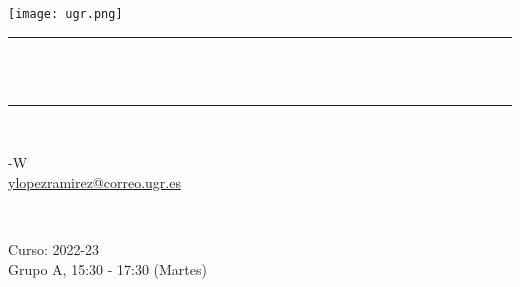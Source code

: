 \begin{titlepage}
	\centering
	\texttt{[image: ugr.png]}\\[1.0 cm]
	\rule{\linewidth}{0.2 mm} \\[0.4 cm]
	{ \huge \bfseries \thetitle}\\
	\rule{\linewidth}{0.2 mm} \\[1.5 cm]
	
	\begin{minipage}{0.5\textwidth}
		\begin{flushleft} \large
			-W \\
			\href{mailto:ylopezramirez@correo.ugr.es}{ylopezramirez@correo.ugr.es}
		\end{flushleft}
	\end{minipage}~
	\begin{minipage}{0.5\textwidth}
		\begin{flushright} \large
			Curso: 2022-23 \\
			Grupo A, 15:30 - 17:30 (Martes)                   
		\end{flushright}
	\end{minipage}\\[1 cm]
	
	{\small \thedate}\\[1 cm]
	
	\vfill
	
\end{titlepage}